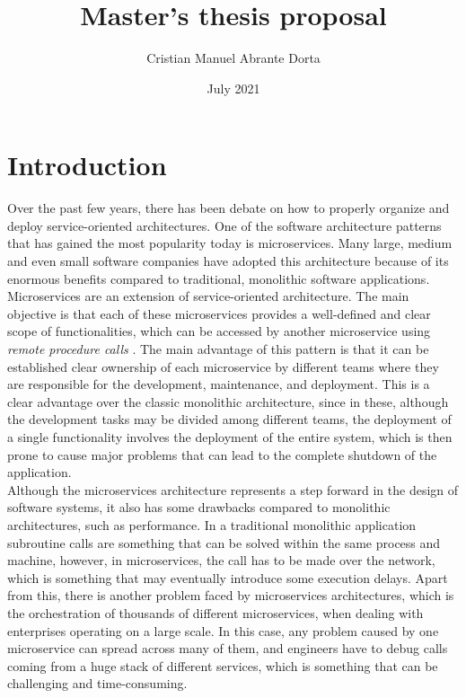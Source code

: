 \documentclass[12pt]{article}
\title{Master's thesis proposal}
\author{Cristian Manuel Abrante Dorta}
\date{July 2021}
\begin{document}
\maketitle

\section{Introduction}

Over the past few years, there has been debate on how to properly organize and deploy service-oriented architectures. One of the software architecture patterns that has gained the most popularity today is microservices. Many large, medium and even small software companies have adopted this architecture because of its enormous benefits compared to traditional, monolithic software applications.\\

Microservices are an extension of service-oriented architecture. The main objective is that each of these microservices provides a well-defined and clear scope of functionalities, which can be accessed by another microservice using \textit{remote procedure calls} \cite{nelson1981remote}. The main advantage of this pattern is that it can be established clear ownership of each microservice by different teams where they are responsible for the development, maintenance, and deployment. This is a clear advantage over the classic monolithic architecture, since in these, although the development tasks may be divided among different teams, the deployment of a single functionality involves the deployment of the entire system, which is then prone to cause major problems that can lead to the complete shutdown of the application.\\

Although the microservices architecture represents a step forward in the design of software systems, it also has some drawbacks compared to monolithic architectures, such as performance. In a traditional monolithic application subroutine calls are something that can be solved within the same process and machine, however, in microservices, the call has to be made over the network, which is something that may eventually introduce some execution delays. Apart from this, there is another problem faced by microservices architectures, which is the orchestration of thousands of different microservices, when dealing with enterprises operating on a large scale. In this case, any problem caused by one microservice can spread across many of them, and engineers have to debug calls coming from a huge stack of different services, which is something that can be challenging and time-consuming.\\
\end{document}
